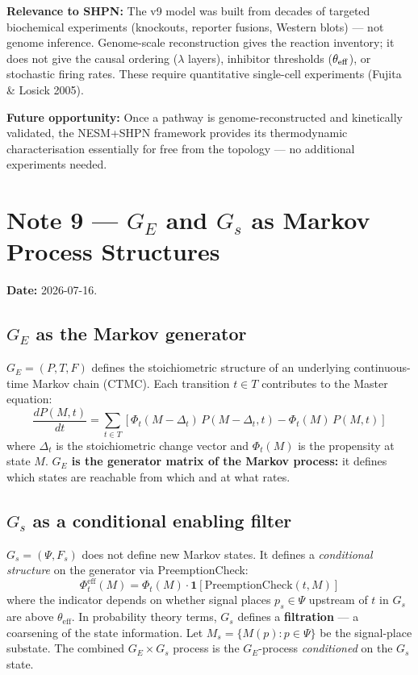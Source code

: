 \documentclass[11pt,a4paper]{article}
\begin{document}
\textbf{Relevance to SHPN:}
The v9 model was built from decades of targeted biochemical experiments
(knockouts, reporter fusions, Western blots) --- not genome inference.
Genome-scale reconstruction gives the reaction inventory; it does not
give the causal ordering ($\lambda$ layers), inhibitor thresholds
($\theta_{\rm eff}$), or stochastic firing rates.
These require quantitative single-cell experiments (Fujita \& Losick
2005).

\textbf{Future opportunity:}
Once a pathway is genome-reconstructed and kinetically validated, the
NESM+SHPN framework provides its thermodynamic characterisation
essentially for free from the topology --- no additional experiments
needed.

\section*{Note 9 — $G_E$ and $G_s$ as Markov Process Structures}

\textbf{Date:} 2026-07-16.

\subsection*{$G_E$ as the Markov generator}

$G_E = (P, T, F)$ defines the stoichiometric structure of an underlying
continuous-time Markov chain (CTMC).
Each transition $t \in T$ contributes to the Master equation:
\begin{equation}
\frac{dP(M,t)}{dt} = \sum_{t \in T}
  \left[\Phi_t(M-\Delta_t)\,P(M-\Delta_t,t)
       - \Phi_t(M)\,P(M,t)\right]
\end{equation}
where $\Delta_t$ is the stoichiometric change vector and $\Phi_t(M)$ is
the propensity at state $M$.
\textbf{$G_E$ is the generator matrix of the Markov process:} it defines
which states are reachable from which and at what rates.

\subsection*{$G_s$ as a conditional enabling filter}

$G_s = (\Psi, F_s)$ does not define new Markov states.
It defines a \emph{conditional structure} on the generator via
PreemptionCheck:
\begin{equation}
\Phi_t^{\mathrm{eff}}(M) = \Phi_t(M)
  \cdot \mathbf{1}[\mathrm{PreemptionCheck}(t,M)]
\end{equation}
where the indicator depends on whether signal places $p_s \in \Psi$
upstream of $t$ in $G_s$ are above $\theta_{\mathrm{eff}}$.
In probability theory terms, $G_s$ defines a \textbf{filtration} ---
a coarsening of the state information.
Let $M_s = \{M(p) : p \in \Psi\}$ be the signal-place substate.
The combined $G_E \times G_s$ process is the $G_E$-process
\emph{conditioned} on the $G_s$ state.
\end{document}
